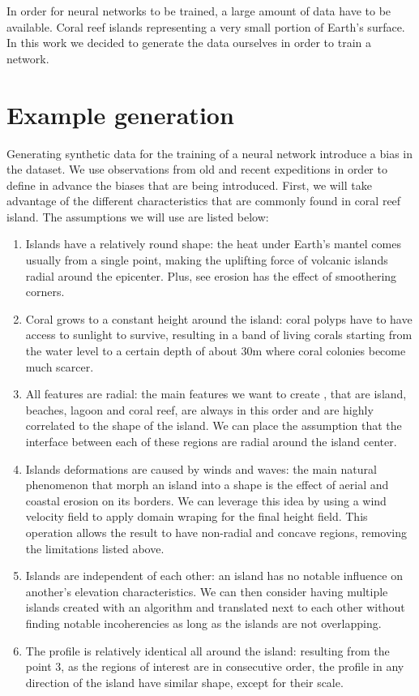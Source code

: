 In order for neural networks to be trained, a large amount of data have to be available. Coral reef islands representing a very small portion of  Earth's surface. In this work we decided to generate the data ourselves in order to train a network. 

\section{Example generation}
\label{sec:coral-island_example-generation}
Generating synthetic data for the training of a neural network introduce a bias in the dataset. We use observations from old and recent expeditions in order to define in advance the biases that are being introduced. First, we will take advantage of the different characteristics that are commonly found in coral reef island. The assumptions we will use are listed below:
\begin{enumerate}
    \item Islands have a relatively round shape: the heat under Earth's mantel comes usually from a single point, making the uplifting force of volcanic islands radial around the epicenter. Plus, see erosion has the effect of smoothering corners.
    \item Coral grows to a constant height around the island: coral polyps have to have access to sunlight to survive, resulting in a band of living corals starting from the water level to a certain depth of about 30m where coral colonies become much scarcer. 
    \item All features are radial: the main features we want to create , that are island, beaches, lagoon and coral reef, are always in this order and are highly correlated to the shape of the island. We can place the assumption that the interface between each of these regions are radial around the island center.
    \item Islands deformations are caused by winds and waves: the main natural phenomenon that morph an island into a shape is the effect of aerial and coastal erosion on its borders. We can leverage this idea by using a wind velocity field to apply domain wraping for the final height field. This operation allows the result to have non-radial and concave regions, removing the limitations listed above.
    \item Islands are independent of each other: an island has no notable influence on another's elevation characteristics. We can then consider having multiple islands created with an algorithm and translated next to each other without finding notable incoherencies as long as the islands are not overlapping.
    \item The profile is relatively identical all around the island: resulting from the point 3, as the regions of interest are in consecutive order, the profile in any direction of the island have similar shape, except for their scale.
\end{enumerate}

